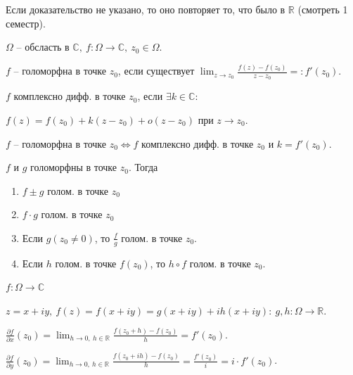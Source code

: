 
Если доказательство не указано, то оно повторяет то, что было в $\mathbb{R}$ (смотреть 1 семестр).

\begin{definition}
    $\Omega$ -- обсласть в $\mathbb{C}, \ f: \Omega \rightarrow \mathbb{C}, \ z_0 \in \Omega$.

    $f$ -- голоморфна в точке $z_0$, если существует $\lim_{z \rightarrow z_0} { \frac{f(z) - f(z_0)}{z - z_0} } =: f'(z_0)$.
\end{definition}
\begin{definition}
    $f$ комплексно дифф. в точке $z_0$, если $\exists k \in \mathbb{C}$:

    $f(z) = f(z_0) + k (z - z_0) + o(z - z_0)$ при $z \rightarrow z_0$.
\end{definition}

\begin{statement}
    $f$ -- голоморфна в точке $z_0 \Leftrightarrow f$ комплексно дифф. в точке $z_0$ и $k = f'(z_0)$.
\end{statement}

\begin{consequence}
    $f$ и $g$ голоморфны в точке $z_0$. Тогда

    \begin{enumerate}
        \item {
            $f \pm g$ голом. в точке $z_0$
        }
        \item {
            $f \cdot g$ голом. в точке $z_0$
        }
        \item {
            Если $g(z_0 \not = 0)$, то $\frac{f}{g}$ голом. в точке $z_0$.
        }
        \item {
            Если $h$ голом. в точке $f(z_0)$, то $h \circ f$ голом. в точке $z_0$.
        }
    \end{enumerate}
\end{consequence}

\begin{remark}
    $f: \Omega \rightarrow \mathbb{C}$

    $z = x + iy, \ f(z) = f(x + iy) = g(x + i y) + i h(x + iy): \ g, h : \Omega \rightarrow \mathbb{R}$.

    $\frac{\partial f}{\partial x} (z_0) = \lim_{h \rightarrow 0, \ h \in \mathbb{R}} {\frac{f(z_0 + h) - f(z_0)}{h}} = f'(z_0)$.


    $\frac{\partial f}{\partial y} (z_0) = \lim_{h \rightarrow 0, \ h \in \mathbb{R}} {\frac{f(z_0 + i h) - f(z_0)}{h}} = \frac{f'(z_0)}{i} = i \cdot f'(z_0)$.
\end{remark}


